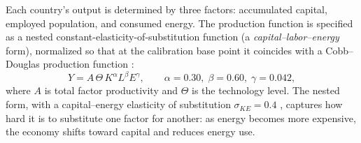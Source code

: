 \documentclass[a4paper,fleqn]{cas-sc}
\newcommand{\response}[1]{\medskip\noindent\textcolor{blue}{\small\itshape [Addressed: #1]}\medskip}
\begin{document}

Each country's output is determined by three factors: accumulated capital, employed population,
and consumed energy. The production function is specified as a nested constant-elasticity-of-sub\-sti\-tu\-tion
function (a \emph{capital--labor--energy} form), normalized so that at the calibration base point
it coincides with a Cobb--Douglas production function \citep{arrow1961}:
\begin{equation}
Y = A \, \Theta \, K^{\alpha} L^{\beta} E^{\gamma},
\qquad \alpha = 0.30,\; \beta = 0.60,\; \gamma = 0.042,
\label{eq:prod}
\end{equation}
where $A$ is total factor productivity and $\Theta$ is the technology level. The nested form, with a
capital--energy elasticity of substitution $\sigma_{KE}=0.4$ \citep{vanderwerf2008,koetse2008}, captures how hard it is to substitute
one factor for another: as energy becomes more expensive, the economy shifts toward capital and
reduces energy use.

\end{document}
